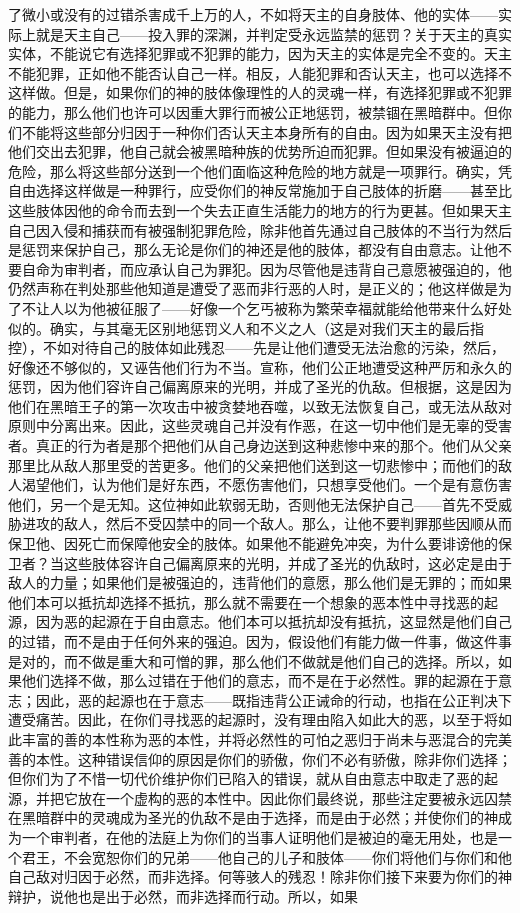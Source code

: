 了微小或没有的过错杀害成千上万的人，不如将天主的自身肢体、他的实体——实际上就是天主自己——投入罪的深渊，并判定受永远监禁的惩罚？关于天主的真实实体，不能说它有选择犯罪或不犯罪的能力，因为天主的实体是完全不变的。天主不能犯罪，正如他不能否认自己一样。相反，人能犯罪和否认天主，也可以选择不这样做。但是，如果你们的神的肢体像理性的人的灵魂一样，有选择犯罪或不犯罪的能力，那么他们也许可以因重大罪行而被公正地惩罚，被禁锢在黑暗群中。但你们不能将这些部分归因于一种你们否认天主本身所有的自由。因为如果天主没有把他们交出去犯罪，他自己就会被黑暗种族的优势所迫而犯罪。但如果没有被逼迫的危险，那么将这些部分送到一个他们面临这种危险的地方就是一项罪行。确实，凭自由选择这样做是一种罪行，应受你们的神反常施加于自己肢体的折磨——甚至比这些肢体因他的命令而去到一个失去正直生活能力的地方的行为更甚。但如果天主自己因入侵和捕获而有被强制犯罪危险，除非他首先通过自己肢体的不当行为然后是惩罚来保护自己，那么无论是你们的神还是他的肢体，都没有自由意志。让他不要自命为审判者，而应承认自己为罪犯。因为尽管他是违背自己意愿被强迫的，他仍然声称在判处那些他知道是遭受了恶而非行恶的人时，是正义的；他这样做是为了不让人以为他被征服了——好像一个乞丐被称为繁荣幸福就能给他带来什么好处似的。确实，与其毫无区别地惩罚义人和不义之人（这是对我们天主的最后指控），不如对待自己的肢体如此残忍——先是让他们遭受无法治愈的污染，然后，好像还不够似的，又诬告他们行为不当。宣称，他们公正地遭受这种严厉和永久的惩罚，因为他们容许自己偏离原来的光明，并成了圣光的仇敌。但根据，这是因为他们在黑暗王子的第一次攻击中被贪婪地吞噬，以致无法恢复自己，或无法从敌对原则中分离出来。因此，这些灵魂自己并没有作恶，在这一切中他们是无辜的受害者。真正的行为者是那个把他们从自己身边送到这种悲惨中来的那个。他们从父亲那里比从敌人那里受的苦更多。他们的父亲把他们送到这一切悲惨中；而他们的敌人渴望他们，认为他们是好东西，不愿伤害他们，只想享受他们。一个是有意伤害他们，另一个是无知。这位神如此软弱无助，否则他无法保护自己——首先不受威胁进攻的敌人，然后不受囚禁中的同一个敌人。那么，让他不要判罪那些因顺从而保卫他、因死亡而保障他安全的肢体。如果他不能避免冲突，为什么要诽谤他的保卫者？当这些肢体容许自己偏离原来的光明，并成了圣光的仇敌时，这必定是由于敌人的力量；如果他们是被强迫的，违背他们的意愿，那么他们是无罪的；而如果他们本可以抵抗却选择不抵抗，那么就不需要在一个想象的恶本性中寻找恶的起源，因为恶的起源在于自由意志。他们本可以抵抗却没有抵抗，这显然是他们自己的过错，而不是由于任何外来的强迫。因为，假设他们有能力做一件事，做这件事是对的，而不做是重大和可憎的罪，那么他们不做就是他们自己的选择。所以，如果他们选择不做，那么过错在于他们的意志，而不是在于必然性。罪的起源在于意志；因此，恶的起源也在于意志——既指违背公正诫命的行动，也指在公正判决下遭受痛苦。因此，在你们寻找恶的起源时，没有理由陷入如此大的恶，以至于将如此丰富的善的本性称为恶的本性，并将必然性的可怕之恶归于尚未与恶混合的完美善的本性。这种错误信仰的原因是你们的骄傲，你们不必有骄傲，除非你们选择；但你们为了不惜一切代价维护你们已陷入的错误，就从自由意志中取走了恶的起源，并把它放在一个虚构的恶的本性中。因此你们最终说，那些注定要被永远囚禁在黑暗群中的灵魂成为圣光的仇敌不是由于选择，而是由于必然；并使你们的神成为一个审判者，在他的法庭上为你们的当事人证明他们是被迫的毫无用处，也是一个君王，不会宽恕你们的兄弟——他自己的儿子和肢体——你们将他们与你们和他自己敌对归因于必然，而非选择。何等骇人的残忍！除非你们接下来要为你们的神辩护，说他也是出于必然，而非选择而行动。所以，如果